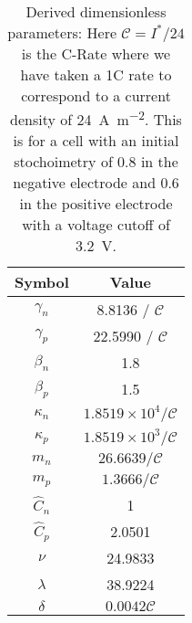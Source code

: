 \documentclass[preprint]{elsarticle}
\begin{document}
\begin{table}[h]
	\centering
	\begin{tabular}{|c|c|}\hline
    	Symbol & Value \\ \hline
        $\gamma_n$ & 8.8136 / $\mathcal{C}$ \\ 
        $\gamma_p$ & 22.5990 / $\mathcal{C}$ \\ 
        $\beta_n$ & 1.8 \\
        $\beta_p$ & 1.5 \\ 
        $\kappa_n$ & $1.8519\times10^4/ \mathcal{C}$  \\ 
        $\kappa_p$ & $1.8519\times10^3/ \mathcal{C}$\\ 
        $m_n$ & $26.6639/ \mathcal{C}$ \\ 
        $m_p$ & $1.3666/ \mathcal{C}$ \\ 
        $\hat{C}_n$ & 1 \\ 
        $\hat{C}_p$ & 2.0501\\
        $\nu$ & 24.9833 \\
        $\lambda$ & 38.9224 \\ 
        $\delta$ & $0.0042 \mathcal{C}$ \\ \hline
    \end{tabular}
    \caption{Derived dimensionless parameters: Here $\mathcal{C}=I^*/24$ is the C-Rate where we have taken a 1C rate to correspond to a current density of \SI{24}{\ampere \metre^{-2}}. This is for a cell with an initial stochoimetry of $0.8$ in the negative electrode and $0.6$ in the positive electrode with a voltage cutoff of \SI{3.2}{\volt}.}\label{tab:nonDim}
\end{table} 
\end{document}
